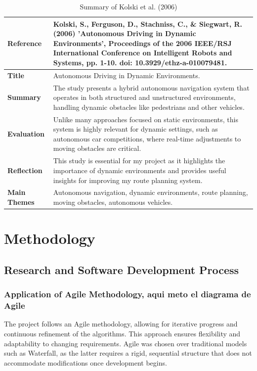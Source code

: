 \documentclass[a4paper,11pt]{report}
\begin{document}
\begin{table}[H]
    \centering
    \begin{tabular}{|p{3cm}|p{10cm}|}
        \hline
        \textbf{Reference} & Kolski, S., Ferguson, D., Stachniss, C., \& Siegwart, R. (2006) 'Autonomous Driving in Dynamic Environments', Proceedings of the 2006 IEEE/RSJ International Conference on Intelligent Robots and Systems, pp. 1-10. doi: 10.3929/ethz-a-010079481. \\ \hline
        \textbf{Title} & Autonomous Driving in Dynamic Environments. \\ \hline
        \textbf{Summary} & The study presents a hybrid autonomous navigation system that operates in both structured and unstructured environments, handling dynamic obstacles like pedestrians and other vehicles. \\ \hline
        \textbf{Evaluation} & Unlike many approaches focused on static environments, this system is highly relevant for dynamic settings, such as autonomous car competitions, where real-time adjustments to moving obstacles are critical. \\ \hline
        \textbf{Reflection} & This study is essential for my project as it highlights the importance of dynamic environments and provides useful insights for improving my route planning system. \\ \hline
        \textbf{Main Themes} & Autonomous navigation, dynamic environments, route planning, moving obstacles, autonomous vehicles. \\ \hline
    \end{tabular}
    \caption{Summary of Kolski et al. (2006)}
    \label{tab:kolski2006}
\end{table}

\chapter{Methodology}
\section{Research and Software Development Process}

\subsection{Application of Agile Methodology, aqui meto el diagrama de Agile}
The project follows an Agile methodology, allowing for iterative progress and continuous refinement of the algorithms. This approach ensures flexibility and adaptability to changing requirements. Agile was chosen over traditional models such as Waterfall, as the latter requires a rigid, sequential structure that does not accommodate modifications once development begins.
\end{document}
